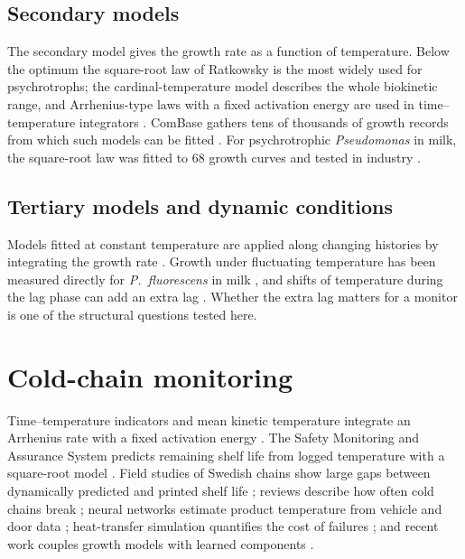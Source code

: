 \documentclass[11pt,a4paper,twoside,openany]{book}
\theoremstyle{plain}\newtheorem{proposition}{Proposition}\newtheorem{corollary}{Corollary}
\theoremstyle{definition}\newtheorem{definition}{Definition}[chapter]
\begin{document}
\subsection{Secondary models}
The secondary model gives the growth rate as a function of temperature. Below the optimum the square-root law of Ratkowsky \cite{ratkowsky1982} is the most widely used for psychrotrophs; the cardinal-temperature model \cite{rosso1993} describes the whole biokinetic range, and Arrhenius-type laws with a fixed activation energy are used in time--temperature integrators \cite{taoukis1989}. ComBase gathers tens of thousands of growth records from which such models can be fitted \cite{baranyi2004,combase}. For psychrotrophic \textit{Pseudomonas} in milk, the square-root law was fitted to 68 growth curves and tested in industry \cite{neumeyer1995,neumeyer1997a}.

\subsection{Tertiary models and dynamic conditions}
Models fitted at constant temperature are applied along changing histories by integrating the growth rate \cite{corradini2005}. Growth under fluctuating temperature has been measured directly for \textit{P.~fluorescens} in milk \cite{lin2016}, and shifts of temperature during the lag phase can add an extra lag \cite{zwietering1994}. Whether the extra lag matters for a monitor is one of the structural questions tested here.

\section{Cold-chain monitoring}
Time--temperature indicators and mean kinetic temperature integrate an Arrhenius rate with a fixed activation energy \cite{taoukis1989,kim2020}. The Safety Monitoring and Assurance System predicts remaining shelf life from logged temperature with a square-root model \cite{koutsoumanis2001,koutsoumanis2005}. Field studies of Swedish chains show large gaps between dynamically predicted and printed shelf life \cite{goransson2018}; reviews describe how often cold chains break \cite{ndraha2018}; neural networks estimate product temperature from vehicle and door data \cite{zou2023}; heat-transfer simulation quantifies the cost of failures \cite{muller2026}; and recent work couples growth models with learned components \cite{sofat2026}.
\end{document}
